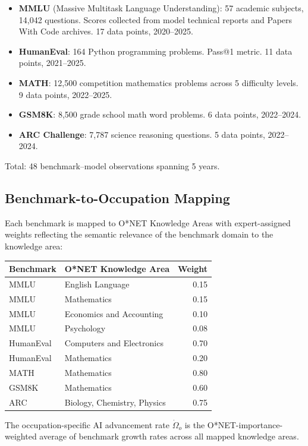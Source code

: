 \documentclass[11pt,a4paper]{article}
\theoremstyle{definition}
\begin{document}
\begin{itemize}[leftmargin=*]
\item \textbf{MMLU} (Massive Multitask Language Understanding): 57 academic subjects, 14,042 questions. Scores collected from model technical reports and Papers With Code archives. 17 data points, 2020--2025.
\item \textbf{HumanEval}: 164 Python programming problems. Pass@1 metric. 11 data points, 2021--2025.
\item \textbf{MATH}: 12,500 competition mathematics problems across 5 difficulty levels. 9 data points, 2022--2025.
\item \textbf{GSM8K}: 8,500 grade school math word problems. 6 data points, 2022--2024.
\item \textbf{ARC Challenge}: 7,787 science reasoning questions. 5 data points, 2022--2024.
\end{itemize}

Total: 48 benchmark--model observations spanning 5 years.

\subsection{Benchmark-to-Occupation Mapping}

Each benchmark is mapped to O*NET Knowledge Areas with expert-assigned weights reflecting the semantic relevance of the benchmark domain to the knowledge area:

\begin{center}
\small
\begin{tabular}{llr}
\toprule
Benchmark & O*NET Knowledge Area & Weight \\
\midrule
MMLU & English Language & 0.15 \\
MMLU & Mathematics & 0.15 \\
MMLU & Economics and Accounting & 0.10 \\
MMLU & Psychology & 0.08 \\
HumanEval & Computers and Electronics & 0.70 \\
HumanEval & Mathematics & 0.20 \\
MATH & Mathematics & 0.80 \\
GSM8K & Mathematics & 0.60 \\
ARC & Biology, Chemistry, Physics & 0.75 \\
\bottomrule
\end{tabular}
\end{center}

The occupation-specific AI advancement rate $\dot{\Omega}_o$ is the O*NET-importance-weighted average of benchmark growth rates across all mapped knowledge areas.
\end{document}
